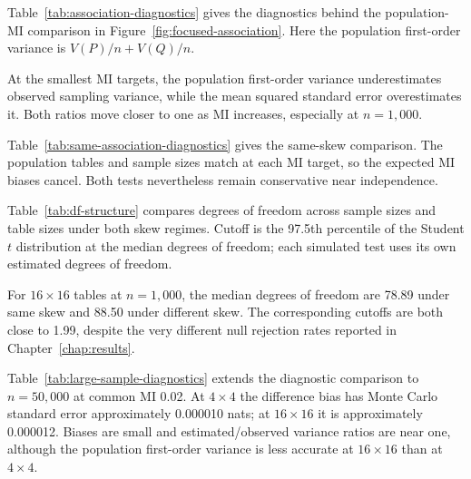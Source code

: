 Table~\ref{tab:association-diagnostics} gives the diagnostics behind
the population-MI comparison in Figure~\ref{fig:focused-association}.
Here the population first-order variance is \(V(P)/n+V(Q)/n\).

\begin{table}[H]
\centering
\small
\caption{Diagnostics for \(4\times4\) different-skew populations with equal MI.}
\label{tab:association-diagnostics}

\end{table}

At the smallest MI targets, the population first-order variance
underestimates observed sampling variance, while the mean squared standard
error overestimates it. Both ratios move closer to one as MI increases,
especially at \(n=1{,}000\).

Table~\ref{tab:same-association-diagnostics} gives the same-skew comparison.
The population tables and sample sizes match at each MI target, so the
expected MI biases cancel. Both tests nevertheless remain conservative
near independence.

\begin{table}[H]
\centering
\small
\caption{Same-skew population-MI sweep and estimation diagnostics.}
\label{tab:same-association-diagnostics}

\end{table}

Table~\ref{tab:df-structure} compares degrees of freedom across sample
sizes and table sizes under both skew regimes. Cutoff is
the 97.5th percentile of the Student \(t\) distribution at the median
degrees of freedom; each simulated test uses its own estimated degrees of
freedom.

\begin{table}[H]
\centering
\small
\caption{Degrees of freedom across sample sizes, table sizes and margins.}
\label{tab:df-structure}

\end{table}

For \(16\times16\) tables at \(n=1{,}000\), the median degrees of
freedom are 78.89 under same skew and 88.50 under different skew. The
corresponding cutoffs are both close to 1.99, despite the very different
null rejection rates reported in Chapter~\ref{chap:results}.

Table~\ref{tab:large-sample-diagnostics} extends the diagnostic comparison
to \(n=50{,}000\) at common MI 0.02.
At \(4\times4\) the difference bias has Monte Carlo standard error
approximately 0.000010 nats; at \(16\times16\) it is approximately
0.000012. Biases are small and estimated/observed variance ratios are near
one, although the population first-order variance is less accurate at
\(16\times16\) than at \(4\times4\).

